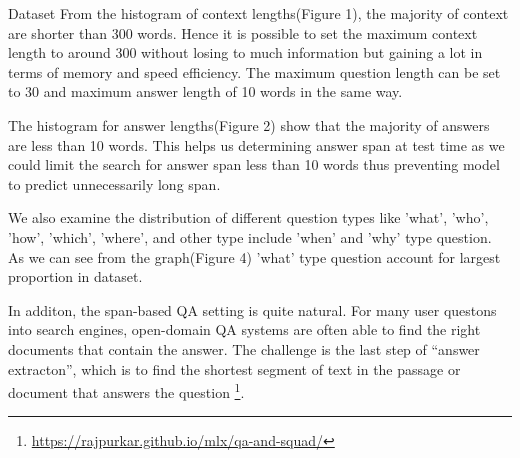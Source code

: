\documentclass{article}
\begin{document}
\begin{psection}{Dataset}
	From the histogram of context lengths(Figure 1), the majority of context are shorter than 300 words. Hence it is possible to set the maximum context length to around 300 without losing to much information but gaining a lot in terms of memory and speed efficiency. The maximum question length can be set to 30 and maximum answer length of 10 words in the same way.

	The histogram for answer lengths(Figure 2) show that the majority of answers are less than 10 words. This helps us determining answer span at test time as we could limit the search for answer span less than 10 words thus preventing model to predict unnecessarily long span.

	We also examine the distribution of different question types like 'what', 'who', 'how', 'which', 'where', and other type include 'when' and 'why' type question. As we can see from the graph(Figure 4) 'what' type question account for largest proportion in dataset.

	In additon, the span-based QA setting is quite natural.
	For many user questons into search engines, open-domain QA systems are often able to find the right documents that contain the answer.
	The challenge is the last step of ``answer extracton'', which is to find the shortest segment of text in the passage or document that answers the question \footnote{\url{https://rajpurkar.github.io/mlx/qa-and-squad/}}.

\end{psection}
\end{document}
